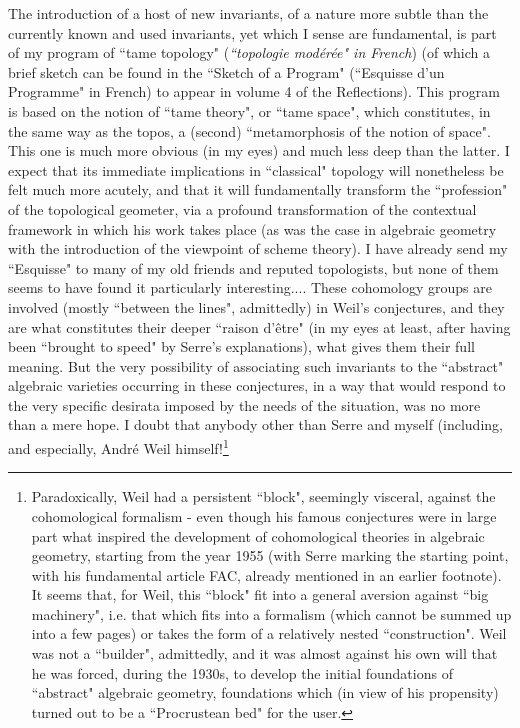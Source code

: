 {The introduction of a host of new invariants, of a nature more subtle than the currently known and used invariants, yet which I sense are fundamental, is part of my program of ``tame topology" (\textit{``topologie mod\'er\'ee" in French}) (of which a brief sketch can be found in the ``Sketch of a Program" (``Esquisse d'un Programme" in French) to appear in volume 4 of the Reflections). This program is based on the notion of ``tame theory", or ``tame space", which constitutes, in the same way as the topos, a (second) ``metamorphosis of the notion of space". This one is much more obvious (in my eyes) and much less deep than the latter. I expect that its immediate implications in ``classical" topology will nonetheless be felt much more acutely, and that it will fundamentally transform the ``profession" of the topological geometer, via a profound transformation of the contextual framework in which his work takes place (as was the case in algebraic geometry with the introduction of the viewpoint of scheme theory). I have already send my ``Esquisse" to many of my old friends and reputed topologists, but none of them seems to have found it particularly interesting...}. These cohomology groups are involved (mostly ``between the lines", admittedly) in Weil's conjectures, and they are what constitutes their deeper ``raison d'\^etre" (in my eyes at least, after having been ``brought to speed" by Serre's explanations), what gives them their full meaning. But the very possibility of associating such invariants to the ``abstract" algebraic varieties occurring in these conjectures, in a way that would respond to the very specific desirata imposed by the needs of the situation, was no more than a mere hope. I doubt that anybody other than Serre and myself (including, and especially, Andr\'e Weil himself!\footnote{Paradoxically, Weil had a persistent ``block", seemingly visceral, against the cohomological formalism - even though his famous conjectures were in large part what inspired the development of cohomological theories in algebraic geometry, starting from the year 1955 (with Serre marking the starting point, with his fundamental article FAC, already mentioned in an earlier footnote). It seems that, for Weil, this ``block" fit into a general aversion against ``big machinery", i.e. that which fits into a formalism (which cannot be summed up into a few pages) or takes the form of a relatively nested ``construction". Weil was not a ``builder", admittedly, and it was almost against his own will that he was forced, during the 1930s, to develop the initial foundations of ``abstract" algebraic geometry, foundations which (in view of his propensity) turned out to be a ``Procrustean bed" for the user. 

}
